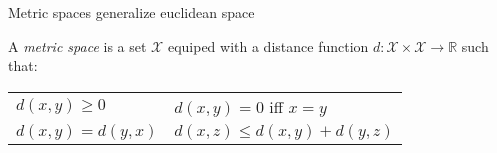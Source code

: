 \begin{frame}[fragile]{Metric spaces generalize euclidean space}
{\begin{tikzpicture}[dot/.style={circle,inner sep=2pt,fill,name=#1},
    extended line/.style={shorten >=-#1,shorten <=-#1},
    extended line/.default=1cm]
\end{tikzpicture}
}
\begin{defn}
A \emph{metric space} is a set $\mathcal{X}$ equiped with a distance function $d : \mathcal{X} \times \mathcal{X} \rightarrow \mathbb{R}$ such that:
\begin{center}
\begin{tabular}{ll}
$d(x,y) \ge 0$ & $d(x,y) = 0$ iff $x=y$ \\
$d(x,y) = d(y,x)$ & $d(x,z) \le d(x,y) + d(y,z)$ \\
\end{tabular}
\end{center}
\end{defn}
\end{frame}


